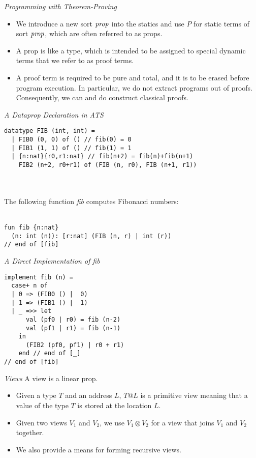\documentclass[pdf]{prosper}
\begin{document}
\begin{slide}{\em Programming with Theorem-Proving}
\begin{itemize}
\item
We introduce a new sort ${\it prop}$ into the statics and use $P$ for static
terms of sort ${\it prop}$, which are often referred to as props.
\item
A prop is like a type, which is intended to be assigned to special dynamic
terms that we refer to as proof terms.
\item
A proof term is required to be pure and total, and it is to be erased
before program execution. In particular, we do not extract programs out of
proofs. Consequently, we can and do construct classical proofs.
\end{itemize}
\end{slide}
\begin{slide}{\em A Dataprop Declaration in ATS}
{\blue\begin{verbatim}
datatype FIB (int, int) =
  | FIB0 (0, 0) of () // fib(0) = 0
  | FIB1 (1, 1) of () // fib(1) = 1
  | {n:nat}{r0,r1:nat} // fib(n+2) = fib(n)+fib(n+1)
    FIB2 (n+2, r0+r1) of (FIB (n, r0), FIB (n+1, r1))
\end{verbatim}
}~\\~\\
The following function {\it fib} computes Fibonacci numbers:\\~\\
{\blue\begin{verbatim}
fun fib {n:nat}
  (n: int (n)): [r:nat] (FIB (n, r) | int (r))
// end of [fib]
\end{verbatim}
}
\vfill
\end{slide}
\begin{slide}{\em A Direct Implementation of {\it fib}}
{\blue\begin{verbatim}
implement fib (n) =
  case+ n of
  | 0 => (FIB0 () |  0)
  | 1 => (FIB1 () |  1)
  | _ =>> let
      val (pf0 | r0) = fib (n-2)
      val (pf1 | r1) = fib (n-1)
    in
      (FIB2 (pf0, pf1) | r0 + r1)
    end // end of [_]
// end of [fib]
\end{verbatim}
}
\end{slide}
\begin{slide}{\em Views}
A view is a linear prop.
\begin{itemize}
\item
Given a type $T$ and an address $L$, $T@L$ is a primitive view
meaning that a value of the type $T$ is stored at the location $L$.
\item
Given two views $V_1$ and $V_2$, we use $V_1\otimes V_2$ for a
view that joins $V_1$ and $V_2$ together.
\item
We also provide a means for forming recursive views. 
\end{itemize}
\end{slide}
\end{document}
